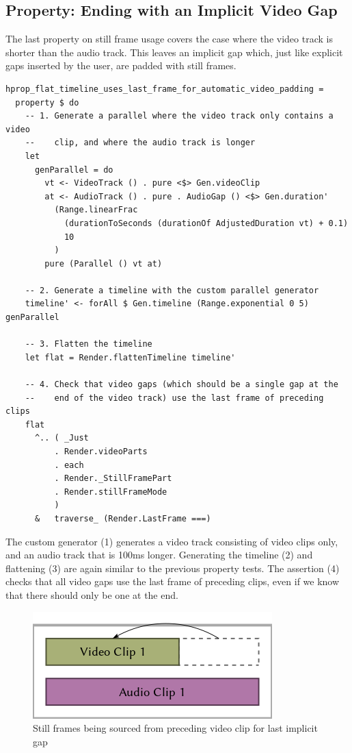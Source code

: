 \subsection{Property: Ending with an Implicit Video Gap}


The last property on still frame usage covers the case where the video track is shorter than the audio track. This leaves an implicit gap which, just like explicit gaps inserted by the user, are padded with still frames.

\begin{verbatim}
hprop_flat_timeline_uses_last_frame_for_automatic_video_padding =
  property $ do
    -- 1. Generate a parallel where the video track only contains a video
    --    clip, and where the audio track is longer
    let
      genParallel = do
        vt <- VideoTrack () . pure <$> Gen.videoClip
        at <- AudioTrack () . pure . AudioGap () <$> Gen.duration'
          (Range.linearFrac
            (durationToSeconds (durationOf AdjustedDuration vt) + 0.1)
            10
          )
        pure (Parallel () vt at)
  
    -- 2. Generate a timeline with the custom parallel generator
    timeline' <- forAll $ Gen.timeline (Range.exponential 0 5) genParallel
  
    -- 3. Flatten the timeline
    let flat = Render.flattenTimeline timeline'
  
    -- 4. Check that video gaps (which should be a single gap at the
    --    end of the video track) use the last frame of preceding clips
    flat
      ^.. ( _Just
          . Render.videoParts
          . each
          . Render._StillFramePart
          . Render.stillFrameMode
          )
      &   traverse_ (Render.LastFrame ===)
\end{verbatim}
The custom generator (1) generates a video track consisting of video clips only, and an audio track that is 100ms longer. Generating the timeline (2) and flattening (3) are again similar to the previous property tests. The assertion (4) checks that all video gaps use the last frame of preceding clips, even if we know that there should only be one at the end.
\begin{figure}[htbp]
 \centering
 \includegraphics[width=.95\linewidth]{./pics/case1_10.png}
 \caption{Still frames being sourced from preceding video clip for last implicit gap}
 \label{fig:case1_10}
\end{figure}



